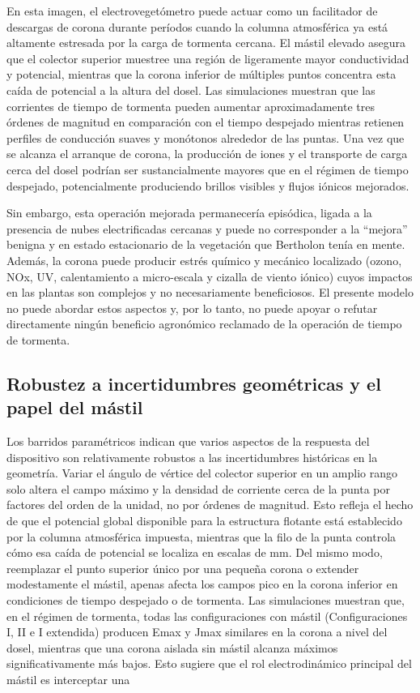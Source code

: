 \documentclass[
]{article}
\begin{document}
En esta imagen, el electrovegetómetro puede actuar como un facilitador
de descargas de corona durante períodos cuando la columna atmosférica ya
está altamente estresada por la carga de tormenta cercana. El mástil
elevado asegura que el colector superior muestree una región de
ligeramente mayor conductividad y potencial, mientras que la corona
inferior de múltiples puntos concentra esta caída de potencial a la
altura del dosel. Las simulaciones muestran que las corrientes de tiempo
de tormenta pueden aumentar aproximadamente tres órdenes de magnitud en
comparación con el tiempo despejado mientras retienen perfiles de
conducción suaves y monótonos alrededor de las puntas. Una vez que se
alcanza el arranque de corona, la producción de iones y el transporte de
carga cerca del dosel podrían ser sustancialmente mayores que en el
régimen de tiempo despejado, potencialmente produciendo brillos visibles
y flujos iónicos mejorados.

Sin embargo, esta operación mejorada permanecería episódica, ligada a la
presencia de nubes electrificadas cercanas y puede no corresponder a la
``mejora'' benigna y en estado estacionario de la vegetación que
Bertholon tenía en mente. Además, la corona puede producir estrés
químico y mecánico localizado (ozono, NOx, UV, calentamiento a
micro-escala y cizalla de viento iónico) cuyos impactos en las plantas
son complejos y no necesariamente beneficiosos. El presente modelo no
puede abordar estos aspectos y, por lo tanto, no puede apoyar o refutar
directamente ningún beneficio agronómico reclamado de la operación de
tiempo de tormenta.

\subsection{Robustez a incertidumbres geométricas y el papel del
mástil}\label{robustez-a-incertidumbres-geomuxe9tricas-y-el-papel-del-muxe1stil}

Los barridos paramétricos indican que varios aspectos de la respuesta
del dispositivo son relativamente robustos a las incertidumbres
históricas en la geometría. Variar el ángulo de vértice del colector
superior en un amplio rango solo altera el campo máximo y la densidad de
corriente cerca de la punta por factores del orden de la unidad, no por
órdenes de magnitud. Esto refleja el hecho de que el potencial global
disponible para la estructura flotante está establecido por la columna
atmosférica impuesta, mientras que la filo de la punta controla cómo esa
caída de potencial se localiza en escalas de mm. Del mismo modo,
reemplazar el punto superior único por una pequeña corona o extender
modestamente el mástil, apenas afecta los campos pico en la corona
inferior en condiciones de tiempo despejado o de tormenta. Las
simulaciones muestran que, en el régimen de tormenta, todas las
configuraciones con mástil (Configuraciones I, II e I extendida)
producen Emax y Jmax similares en la corona a nivel del dosel, mientras
que una corona aislada sin mástil alcanza máximos significativamente más
bajos. Esto sugiere que el rol electrodinámico principal del mástil es
interceptar una
\end{document}

